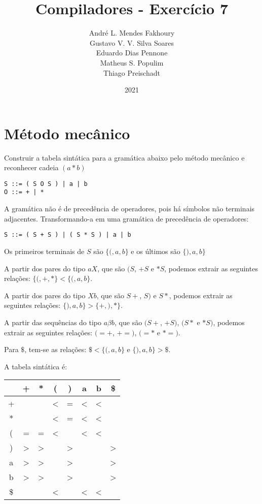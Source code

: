 \documentclass{article}
\title{Compiladores - Exercício 7}
\author{André L. Mendes Fakhoury\\
Gustavo V. V. Silva Soares\\
Eduardo Dias Pennone\\
Matheus S. Populim\\
Thiago Preischadt\\
}
\date{2021}
\begin{document}
\maketitle

\section{Método mecânico}

Construir  a  tabela  sintática  para  a  gramática  abaixo  pelo  método mecânico e reconhecer cadeia $(a*b)$

\begin{lstlisting}
S ::= ( S O S ) | a | b
O ::= + | *
\end{lstlisting}

A gramática não é de precedência de operadores, pois há símbolos não terminais adjacentes. Transformando-a em uma gramática de precedência de operadores:
\begin{lstlisting}
S ::= ( S + S ) | ( S * S ) | a | b
\end{lstlisting}

Os primeiros terminais de $S$ são $\{(, a, b\}$ e os últimos são $\{), a, b\}$

A partir dos pares do tipo $aX$, que são $( S$, $+ S$ e $* S$, podemos extrair as seguintes relações: $\{ (, +, * \} < \{ (, a, b \}$.

A partir dos pares do tipo $Xb$, que são $S +$, $S )$ e $S *$, podemos extrair as seguintes relações: $\{ ), a, b \} > \{ +, ), * \}$.

A partir das sequências do tipo $a\beta b$, que são $( S +$, $+ S )$, $( S *$ e $* S )$, podemos extrair as seguintes relações: $( = +$, $+ = )$, $( = *$ e $* = )$.

Para $\$$, tem-se as relações: $\$ < \{ (, a, b \}$ e $\{ ), a, b \} > \$$.

A tabela sintática é:
\begin{center}
\begin{tabular}{ |c|c|c|c|c|c|c|c| } 
\hline
  & + & * & ( & ) & a & b & \$ \\
\hline
+ &   &   & < & = & < & < &  \\
\hline
* &   &   & < & = & < & < &  \\
\hline
( & = & = & < &   & < & < &  \\
\hline
) & > & > &   & > &   &   & >\\
\hline
a & > & > &   & > &   &   & >\\
\hline
b & > & > &   & > &   &   & >\\
\hline
\$ &   &   & < &   & < & < &  \\
\hline
\end{tabular}
\end{center}
\end{document}
